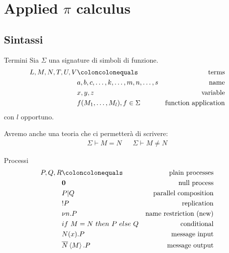 \documentclass{beamer}
\theoremstyle{plain}
\theoremstyle{definition}
\theoremstyle{remark}
\newcommand{\obar}[1]{\overline{#1}}
\begin{document}
\section{Applied $\pi$ calculus}

\subsection{Sintassi}

\begin{frame}{Termini}
  Sia $\Sigma$ una signature di simboli di funzione.  
  \begin{align*}
    L,M,N,T,U,V & \coloncolonequals & \text{terms} \\
                & a,b,c,\dots,k,\dots,m,n,\dots,s & \text{name} \\
                & x,y,z & \text{variable} \\
                & f(M_1,\dots,M_l), f\in \Sigma & \text{function application}
  \end{align*}
  con $l$ opportuno.

  Avremo anche una teoria che ci permetter\`a di scrivere:
  \begin{align*}
    \Sigma \vdash M = N & & \Sigma \vdash M \neq N
  \end{align*}
\end{frame}

\begin{frame}{Processi}
  \begin{align*}
  P,Q,R & \coloncolonequals & \text{plain processes} \\
  & \mathbf{0} & \text{null process} \\
  & P | Q & \text{parallel composition} \\
  & !P & \text{replication} \\
  & \nu n.P & \text{name restriction (new)} \\
  & if\ M=N\ then\ P\ else\ Q & \text{conditional} \\
  & N(x).P & \text{message input} \\
  & \obar{N}\left< M\right> .P & \text{message output}
\end{align*}

\end{frame}
\end{document}
